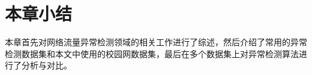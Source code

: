 \section{本章小结}
本章首先对网络流量异常检测领域的相关工作进行了综述，然后介绍了常用的异常检测数据集和本文中使用的校园网数据集，最后在多个数据集上对异常检测算法进行了分析与对比。


  
  
  
  
  
  





